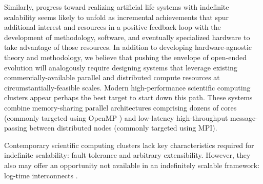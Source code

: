 Similarly, progress toward realizing artificial life systems with %
indefinite scalability seems likely to unfold as 
incremental achievements that spur additional interest and resources in a positive feedback loop with the development of methodology, software, and eventually specialized hardware to take advantage of those resources.
In addition to developing hardware-agnostic theory and methodology, we believe that pushing the envelope of open-ended evolution will analogously require %
designing systems %
that leverage existing commercially-available parallel and distributed compute resources at circumstantially-feasible scales.
Modern high-performance scientific computing clusters appear perhaps the best target to start down this path.
These systems combine
memory-sharing parallel architectures comprising dozens of cores (commonly targeted using OpenMP \citep{dagum1998openmp}) and low-latency high-throughput message-passing between distributed nodes (commonly targeted using MPI\citep{clarke1994mpi}).

Contemporary scientific computing clusters lack key characteristics %
required for indefinite scalability: fault tolerance and arbitrary extensibility.
However, they also may offer an opportunity not available in an indefinitely scalable framework: log-time interconnects \citep{mollah2018comparative}.



